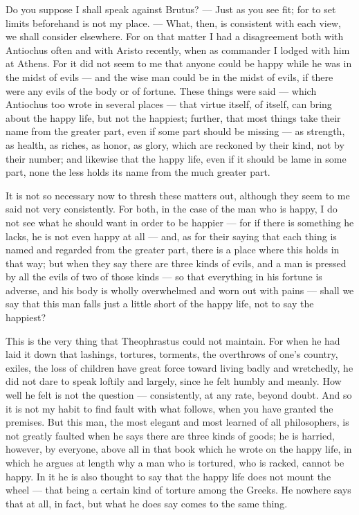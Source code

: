  Do you suppose I shall speak against Brutus? — Just as you see fit; for to set limits beforehand is not my place. — What, then, is consistent with each view, we shall consider elsewhere. For on that matter I had a disagreement both with Antiochus often and with Aristo recently, when as commander I lodged with him at Athens. For it did not seem to me that anyone could be happy while he was in the midst of evils — and the wise man could be in the midst of evils, if there were any evils of the body or of fortune. These things were said — which Antiochus too wrote in several places — that virtue itself, of itself, can bring about the happy life, but not the happiest; further, that most things take their name from the greater part, even if some part should be missing — as strength, as health, as riches, as honor, as glory, which are reckoned by their kind, not by their number; and likewise that the happy life, even if it should be lame in some part, none the less holds its name from the much greater part.

 It is not so necessary now to thresh these matters out, although they seem to me said not very consistently. For both, in the case of the man who is happy, I do not see what he should want in order to be happier — for if there is something he lacks, he is not even happy at all — and, as for their saying that each thing is named and regarded from the greater part, there is a place where this holds in that way; but when they say there are three kinds of evils, and a man is pressed by all the evils of two of those kinds — so that everything in his fortune is adverse, and his body is wholly overwhelmed and worn out with pains — shall we say that this man falls just a little short of the happy life, not to say the happiest?

 This is the very thing that Theophrastus could not maintain. For when he had laid it down that lashings, tortures, torments, the overthrows of one's country, exiles, the loss of children have great force toward living badly and wretchedly, he did not dare to speak loftily and largely, since he felt humbly and meanly. How well he felt is not the question — consistently, at any rate, beyond doubt. And so it is not my habit to find fault with what follows, when you have granted the premises. But this man, the most elegant and most learned of all philosophers, is not greatly faulted when he says there are three kinds of goods; he is harried, however, by everyone, above all in that book which he wrote on the happy life, in which he argues at length why a man who is tortured, who is racked, cannot be happy. In it he is also thought to say that the happy life does not mount the wheel — that being a certain kind of torture among the Greeks. He nowhere says that at all, in fact, but what he does say comes to the same thing.

